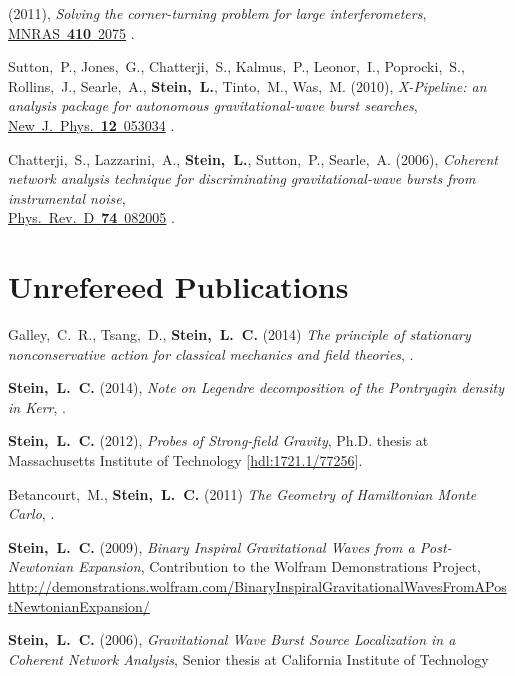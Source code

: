 \begin{etaremune}[start=\value{pubCounter}]
  (2011),
  {\it Solving the corner-turning problem for large interferometers},
  \href{http://dx.doi.org/10.1111/j.1365-2966.2010.17587.x}{MNRAS~{\bf 410}~2075}
  .
\item
  Sutton,~P., Jones,~G., Chatterji,~S., Kalmus,~P., Leonor,~I.,
  Poprocki,~S., Rollins,~J., Searle,~A., {\bf Stein,~L.}, Tinto,~M.,
  Was,~M.
  (2010),
  {\it X-Pipeline: an analysis package for autonomous
    gravitational-wave burst searches},
  \href{http://dx.doi.org/10.1088/1367-2630/12/5/053034}{New~J.~Phys.~{\bf 12}~053034}
  .
\item
  Chatterji,~S., Lazzarini,~A., {\bf Stein,~L.}, Sutton,~P.,
  Searle,~A.
  (2006),
  {\it Coherent network analysis technique for
    discriminating gravitational-wave bursts from instrumental noise},\\
  \href{http://dx.doi.org/10.1103/PhysRevD.74.082005}{Phys.~Rev.~D~{\bf 74}~082005}
  .
  \setcounter{pubCounter}{\value{enumi}}
\end{etaremune}

\section{Unrefereed Publications}
\secstartswithlist{}%
\addtocounter{pubCounter}{-1}%
\begin{etaremune}[start=\value{pubCounter}]
\item
  Galley,~C.~R., Tsang,~D., {\bf Stein,~L.~C.}
  (2014)
  {\it The principle of stationary nonconservative action for
    classical mechanics and field theories},
  .
\item
  {\bf Stein,~L.~C.}
  (2014),
  {\it Note on Legendre decomposition of the Pontryagin density in Kerr},
  .
\item
  {\bf Stein,~L.~C.}
  (2012),
  {\it Probes of Strong-field Gravity}, Ph.D. thesis at Massachusetts
  Institute of Technology
  [\href{http://hdl.handle.net/1721.1/77256}{hdl:1721.1/77256}].
\item
  Betancourt,~M., {\bf Stein,~L.~C.}
  (2011)
  {\it The Geometry of Hamiltonian Monte Carlo},
  .
\item
  {\bf Stein,~L.~C.}
  (2009),
  {\it Binary Inspiral Gravitational Waves from a Post-Newtonian Expansion},
  Contribution to the Wolfram Demonstrations Project,
  \url{http://demonstrations.wolfram.com/BinaryInspiralGravitationalWavesFromAPostNewtonianExpansion/}
\item
  {\bf Stein,~L.~C.}
  (2006),
  {\it Gravitational Wave Burst Source Localization in a Coherent
    Network Analysis},
  Senior thesis at California Institute of Technology
\end{etaremune}


